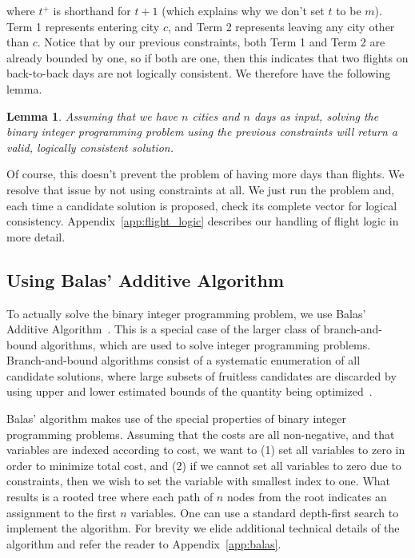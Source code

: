 \documentclass{article}
\newtheorem{lem}[thm]{Lemma}
\begin{document}
where $t^+$ is shorthand for $t+1$ (which explains why we don't set $t$ to be $m$). Term 1 represents entering city $c$, and Term 2 represents leaving
any city other than $c$. Notice that by our previous constraints, both Term 1 and Term 2 are already bounded by one, so if both are one, then this
indicates that two flights on back-to-back days are not logically consistent. We therefore have the following lemma.

\begin{lem}\label{lem:correctness}
Assuming that we have $n$ cities and $n$ days as input, solving the binary integer programming problem using the previous constraints will return a
valid, logically consistent solution.
\end{lem}

Of course, this doesn't prevent the problem of having more days than flights. We resolve that issue by not using constraints at all. We just run the
problem and, each time a candidate solution is proposed, check its complete vector for logical consistency. Appendix~\ref{app:flight_logic} describes
our handling of flight logic in more detail.

\subsection{Using Balas' Additive Algorithm}\label{sec:balas}

To actually solve the binary integer programming problem, we use Balas' Additive Algorithm~\cite{doi:10.1287/opre.13.4.517}. This is a special case of
the larger class of branch-and-bound algorithms, which are used to solve integer programming problems. Branch-and-bound algorithms consist of a
systematic enumeration of all candidate solutions, where large subsets of fruitless candidates are discarded by using upper and lower estimated bounds
of the quantity being optimized~\cite{Clausen1997}.

Balas' algorithm makes use of the special properties of binary integer programming problems. Assuming that the costs are all non-negative, and that
variables are indexed according to cost, we want to (1) set all variables to zero in order to minimize total cost, and (2) if we cannot set all
variables to zero due to constraints, then we wish to set the variable with smallest index to one. What results is a rooted tree where each path of
$n$ nodes from the root indicates an assignment to the first $n$ variables. One can use a standard depth-first search to implement the algorithm.  For
brevity we elide additional technical details of the algorithm and refer the reader to Appendix~\ref{app:balas}.
\end{document}
